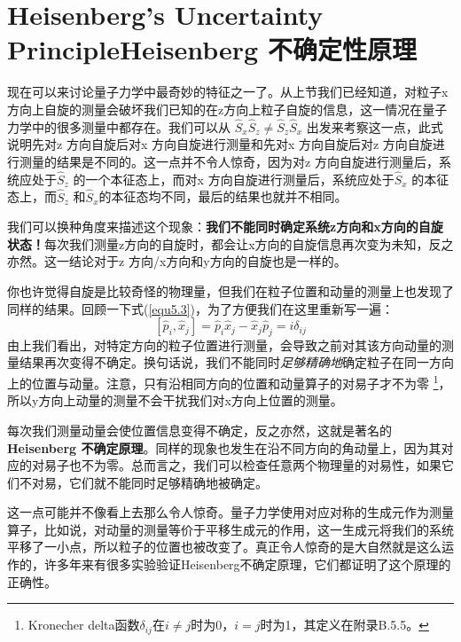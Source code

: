 \section[Heisenberg 不确定性原理]{Heisenberg’s Uncertainty PrincipleHeisenberg 不确定性原理}\label{sec8.6}
现在可以来讨论量子力学中最奇妙的特征之一了。从上节我们已经知道，对粒子x方向上自旋的测量会破坏我们已知的在z方向上粒子自旋的信息，这一情况在量子力学中的很多测量中都存在。我们可以从 $\hat S_x \hat S_z \ne \hat S_z \hat S_x$ 出发来考察这一点，此式说明先对z 方向自旋后对x 方向自旋进行测量和先对x 方向自旋后对z 方向自旋进行测量的结果是不同的。这一点并不令人惊奇，因为对z 方向自旋进行测量后，系统应处于$\hat S_z$ 的一个本征态上，而对x 方向自旋进行测量后，系统应处于$\hat S_x$ 的本征态上，而$\hat S_z$ 和$\hat S_x$的本征态均不同，最后的结果也就并不相同。
\par
我们可以换种角度来描述这个现象：\textbf{我们不能同时确定系统z方向和x方向的自旋状态！}每次我们测量z方向的自旋时，都会让x方向的自旋信息再次变为未知，反之亦然。这一结论对于z 方向/x方向和y方向的自旋也是一样的。
\par
你也许觉得自旋是比较奇怪的物理量，但我们在粒子位置和动量的测量上也发现了同样的结果。回顾一下式(\ref{equ5.3})，为了方便我们在这里重新写一遍：
\begin{equation}
\label{equ8.61}
[\hat p_i,\hat x_j]=\hat p_i \hat x_j - \hat x_j \hat p_j =i \delta_{ij}
\end{equation}
由上我们看出，对特定方向的粒子位置进行测量，会导致之前对其该方向动量的测量结果再次变得不确定。换句话说，我们不能同时{\it{足够精确地}}确定粒子在同一方向上的位置与动量。注意，只有沿相同方向的位置和动量算子的对易子才不为零
\footnote{Kronecher delta函数$\delta_{ij}$在$i\ne j$时为0，$i=j$时为1，其定义在附录B.5.5。}，所以y方向上动量的测量不会干扰我们对x方向上位置的测量。
\par
每次我们测量动量会使位置信息变得不确定，反之亦然，这就是著名的\textbf{Heisenberg 不确定原理}。同样的现象也发生在沿不同方向的角动量上，因为其对应的对易子也不为零。总而言之，我们可以检查任意两个物理量的对易性，如果它们不对易，它们就不能同时{足够精确地}被确定。
\par
这一点可能并不像看上去那么令人惊奇。量子力学使用对应对称的生成元作为测量算子，比如说，对动量的测量等价于平移生成元的作用，这一生成元将我们的系统平移了一小点，所以粒子的位置也被改变了。真正令人惊奇的是大自然就是这么运作的，许多年来有很多实验验证Heisenberg不确定原理，它们都证明了这个原理的正确性。

